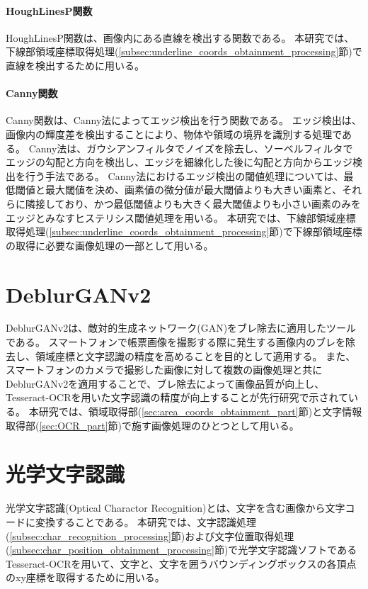 \paragraph{HoughLinesP関数}
HoughLinesP関数は、画像内にある直線を検出する関数である。
本研究では、下線部領域座標取得処理(\ref{subsec:underline_coords_obtainment_processing}節)で直線を検出するために用いる。

\paragraph{Canny関数}
Canny関数は、Canny法によってエッジ検出を行う関数である。
エッジ検出は、画像内の輝度差を検出することにより、物体や領域の境界を識別する処理である\cite{エッジ検出}。
Canny法は、ガウシアンフィルタでノイズを除去し、ソーベルフィルタでエッジの勾配と方向を検出し、エッジを細線化した後に勾配と方向からエッジ検出を行う手法である。
Canny法におけるエッジ検出の閾値処理については、最低閾値と最大閾値を決め、画素値の微分値が最大閾値よりも大きい画素と、それらに隣接しており、かつ最低閾値よりも大きく最大閾値よりも小さい画素のみをエッジとみなすヒステリシス閾値処理を用いる\cite{Canny法}。
本研究では、下線部領域座標取得処理(\ref{subsec:underline_coords_obtainment_processing}節)で下線部領域座標の取得に必要な画像処理の一部として用いる。


\section{DeblurGANv2}\label{sec:DeblurGANv2}
DeblurGANv2は、敵対的生成ネットワーク(GAN)をブレ除去に適用したツールである\cite{DeblurGANv2}。
スマートフォンで帳票画像を撮影する際に発生する画像内のブレを除去し、領域座標と文字認識の精度を高めることを目的として適用する。
また、スマートフォンのカメラで撮影した画像に対して複数の画像処理と共にDeblurGANv2を適用することで、ブレ除去によって画像品質が向上し、Tesseract-OCRを用いた文字認識の精度が向上することが先行研究で示されている\cite{DeblurGANv2の先行研究}。
本研究では、領域取得部(\ref{sec:area_coords_obtainment_part}節)と文字情報取得部(\ref{sec:OCR_part}節)で施す画像処理のひとつとして用いる。


\section{光学文字認識}\label{sec:Optical-Charactor-Recognition}
光学文字認識(Optical Charactor Recognition)とは、文字を含む画像から文字コードに変換することである\cite{光学文字認識}。
本研究では、文字認識処理(\ref{subsec:char_recognition_processing}節)および文字位置取得処理(\ref{subsec:char_position_obtainment_processing}節)で光学文字認識ソフトであるTesseract-OCRを用いて、文字と、文字を囲うバウンディングボックスの各頂点のxy座標を取得するために用いる。

